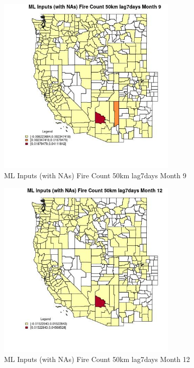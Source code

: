 \begin{figure} 
\centering  
\includegraphics[width=0.77\textwidth]{Code_Outputs/Report_ML_input_PM25_Step4_part_e_de_duplicated_aves_compiled_2019-05-20wNAs_CountyFire_Count_50km_lag7daysmedianMonth9.jpg} 
\caption{\label{fig:Report_ML_input_PM25_Step4_part_e_de_duplicated_aves_compiled_2019-05-20wNAsCountyFire_Count_50km_lag7daysmedianMonth9}ML Inputs (with NAs) Fire Count 50km lag7days Month 9} 
\end{figure} 
 

\begin{figure} 
\centering  
\includegraphics[width=0.77\textwidth]{Code_Outputs/Report_ML_input_PM25_Step4_part_e_de_duplicated_aves_compiled_2019-05-20wNAs_CountyFire_Count_50km_lag7daysmedianMonth12.jpg} 
\caption{\label{fig:Report_ML_input_PM25_Step4_part_e_de_duplicated_aves_compiled_2019-05-20wNAsCountyFire_Count_50km_lag7daysmedianMonth12}ML Inputs (with NAs) Fire Count 50km lag7days Month 12} 
\end{figure} 
 

